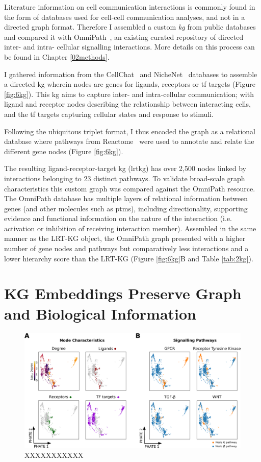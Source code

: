 Literature information on cell communication interactions is commonly found in the form of databases used for cell-cell communication analyses, and not in a directed graph format. Therefore I assembled a custom \emph{kg} from public databases and compared it with OmniPath~\cite{turei_integrated_2021}, an existing curated repository of directed inter- and intra- cellular signalling interactions. More details on this process can be found in Chapter \ref{02methods}.

I gathered information from the CellChat~\cite{sqjin_sqjincellchat_2021} and NicheNet~\cite{browaeys_nichenet_2020} databases to assemble a directed \acrshort{kg} wherein nodes are genes for ligands, receptors or \acrfull{tf} targets (Figure \ref{fig:6kg}). This \acrshort{kg} aims to capture inter- and intra-cellular communication; with ligand and receptor nodes describing the relationship between interacting cells, and the \acrshort{tf} targets capturing cellular states and response to stimuli.

Following the ubiquitous triplet format, I thus encoded the graph as a relational database where pathways from Reactome~\cite{gillespie_reactome_2022} were used to annotate and relate the different gene nodes (Figure \ref{fig:6kg}).

The resulting ligand-receptor-target \acrshort{kg} (\acrshort{lrtkg}) has over 2,500 nodes linked by interactions belonging to 23 distinct pathways. To validate broad-scale graph characteristics this custom graph was compared against the OmniPath resource.
The OmniPath database has multiple layers of relational information between genes (and other molecules such as \acrshort{ptm}s), including directionality, supporting evidence and functional information on the nature of the interaction (i.e. activation or inhibition of receiving interaction member). Assembled in the same manner as the LRT-KG object, the OmniPath graph presented with a higher number of gene nodes and pathways but comparatively less interactions  and a lower hierarchy score than the LRT-KG (Figure \ref{fig:6kg}B and Table \ref{tab:2kg}).


\section{KG Embeddings Preserve Graph and Biological Information}

\begin{figure}
    \centering
    \includegraphics{06kg/figs/6KG_embed.png}
    \caption{XXXXXXXXXXX}
    \label{fig:6embed}
\end{figure}

